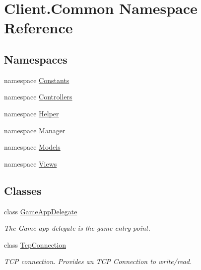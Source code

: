 \hypertarget{namespaceClient_1_1Common}{}\section{Client.\+Common Namespace Reference}
\label{namespaceClient_1_1Common}
\subsection*{Namespaces}
\begin{DoxyCompactItemize}
\item 
namespace \hyperlink{namespaceClient_1_1Common_1_1Constants}{Constants}
\item 
namespace \hyperlink{namespaceClient_1_1Common_1_1Controllers}{Controllers}
\item 
namespace \hyperlink{namespaceClient_1_1Common_1_1Helper}{Helper}
\item 
namespace \hyperlink{namespaceClient_1_1Common_1_1Manager}{Manager}
\item 
namespace \hyperlink{namespaceClient_1_1Common_1_1Models}{Models}
\item 
namespace \hyperlink{namespaceClient_1_1Common_1_1Views}{Views}
\end{DoxyCompactItemize}
\subsection*{Classes}
\begin{DoxyCompactItemize}
\item 
class \hyperlink{classClient_1_1Common_1_1GameAppDelegate}{Game\+App\+Delegate}
\begin{DoxyCompactList}\small\item\em The Game app delegate is the game entry point. \end{DoxyCompactList}\item 
class \hyperlink{classClient_1_1Common_1_1TcpConnection}{Tcp\+Connection}
\begin{DoxyCompactList}\small\item\em T\+C\+P connection. Provides an T\+C\+P Connection to write/read. \end{DoxyCompactList}\end{DoxyCompactItemize}
